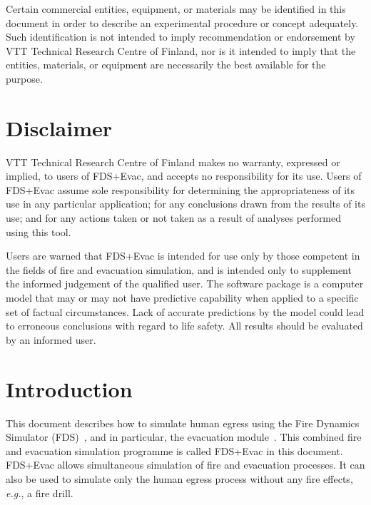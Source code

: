 \documentclass[12pt,a4paper,final,twoside]{stylevk}
\begin{document}
Certain commercial entities, equipment, or materials may be identified
in this document in order to describe an experimental procedure or
concept adequately.  Such identification is not intended to imply
recommendation or endorsement by VTT Technical Research Centre of
Finland, nor is it intended to imply that the entities, materials, or
equipment are necessarily the best available for the purpose.


\newpage


\chapter*{Disclaimer}

\noindent VTT Technical Research Centre of Finland makes no warranty,
expressed or implied, to users of FDS+Evac, and accepts no
responsibility for its use.  Users of FDS+Evac assume sole
responsibility for determining the appropriateness of its use in any
particular application; for any conclusions drawn from the results of
its use; and for any actions taken or not taken as a result of
analyses performed using this tool.


Users are warned that FDS+Evac is intended for use only by those
competent in the fields of fire and evacuation simulation, and is
intended only to supplement the informed judgement of the qualified
user.  The software package is a computer model that may or may not
have predictive capability when applied to a specific set of factual
circumstances.  Lack of accurate predictions by the model could lead
to erroneous conclusions with regard to life safety.  All results
should be evaluated by an informed user.


\clearpage

\newpage


\tableofcontents

\newpage

\chapter{Introduction}\label{Sec_Intro}

\noindent This document describes how to simulate human egress using
the Fire Dynamics Simulator (FDS)~\cite{FDS_Manual, FDS_UserGuide,
  FDS_VVGuide1, FDS_VVGuide2}, and in particular, the evacuation
module~\cite{Korhonen05, Korhonen07a, Korhonen07b, Korhonen08a,
  Korhonen08b}.  This combined fire and evacuation simulation
programme is called FDS+Evac in this document.  FDS+Evac allows
simultaneous simulation of fire and evacuation processes.  It can also
be used to simulate only the human egress process without any fire
effects, \emph{e.g.}, a fire drill.
\end{document}
